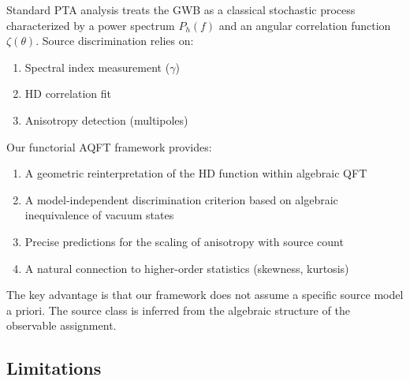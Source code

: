 \documentclass[11pt,a4paper]{article}
\begin{document}
Standard PTA analysis treats the GWB as a classical stochastic process characterized by a power spectrum $P_h(f)$ and an angular correlation function $\zeta(\theta)$. Source discrimination relies on:
\begin{enumerate}
\item Spectral index measurement ($\gamma$) \cite{Agazie:2024}
\item HD correlation fit \cite{Hellings:1983}
\item Anisotropy detection (multipoles) \cite{Grimm:2025,SatoPolito:2023}
\end{enumerate}

Our functorial AQFT framework provides:
\begin{enumerate}
\item A geometric reinterpretation of the HD function within algebraic QFT
\item A model-independent discrimination criterion based on algebraic inequivalence of vacuum states
\item Precise predictions for the scaling of anisotropy with source count
\item A natural connection to higher-order statistics (skewness, kurtosis)
\end{enumerate}

The key advantage is that our framework does not assume a specific source model a priori. The source class is inferred from the algebraic structure of the observable assignment.

\subsection{Limitations}\label{sec:limitations}
\end{document}
